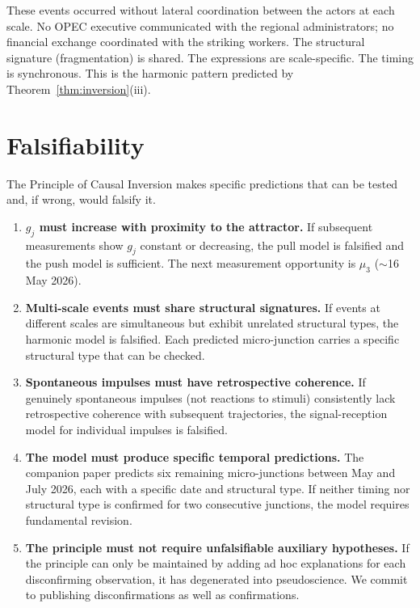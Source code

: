 \documentclass[12pt,a4paper]{article}
\newcommand{\gj}{g_j}
\begin{document}
These events occurred without lateral coordination between the actors at each scale. No OPEC executive communicated with the regional administrators; no financial exchange coordinated with the striking workers. The structural signature (fragmentation) is shared. The expressions are scale-specific. The timing is synchronous. This is the harmonic pattern predicted by Theorem~\ref{thm:inversion}(iii).


\section{Falsifiability}

The Principle of Causal Inversion makes specific predictions that can be tested and, if wrong, would falsify it.

\begin{enumerate}[label=\textbf{F\arabic*.}]
    \item \textbf{$\gj$ must increase with proximity to the attractor.} If subsequent measurements show $\gj$ constant or decreasing, the pull model is falsified and the push model is sufficient. The next measurement opportunity is $\mu_3$ ($\sim$16 May 2026).
    \item \textbf{Multi-scale events must share structural signatures.} If events at different scales are simultaneous but exhibit unrelated structural types, the harmonic model is falsified. Each predicted micro-junction carries a specific structural type that can be checked.
    \item \textbf{Spontaneous impulses must have retrospective coherence.} If genuinely spontaneous impulses (not reactions to stimuli) consistently lack retrospective coherence with subsequent trajectories, the signal-reception model for individual impulses is falsified.
    \item \textbf{The model must produce specific temporal predictions.} The companion paper \cite{ghioni2026collapse} predicts six remaining micro-junctions between May and July 2026, each with a specific date and structural type. If neither timing nor structural type is confirmed for two consecutive junctions, the model requires fundamental revision.
    \item \textbf{The principle must not require unfalsifiable auxiliary hypotheses.} If the principle can only be maintained by adding ad hoc explanations for each disconfirming observation, it has degenerated into pseudoscience. We commit to publishing disconfirmations as well as confirmations.
\end{enumerate}
\end{document}
